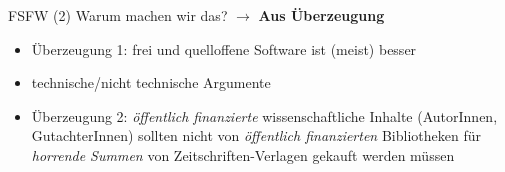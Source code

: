\documentclass[t]{beamer}
\begin{document}

\begin{frame}[label=ct2]{\color{fg}FSFW (2)}
Warum machen wir das? $\rightarrow$ \textbf{Aus Überzeugung}\\[1cm]
  \begin{itemize}
  \item Überzeugung 1: frei und quelloffene Software ist (meist) besser
  \item[] technische/nicht technische Argumente
  \pause
  \bigskip
  \item Überzeugung 2: \textit{öffentlich finanzierte} wissenschaftliche Inhalte
  (AutorInnen, GutachterInnen) sollten nicht von \textit{öffentlich finanzierten}
  Bibliotheken für \textit{horrende Summen} von Zeitschriften-Verlagen gekauft werden müssen
  \end{itemize}  
\end{frame}
\end{document}
